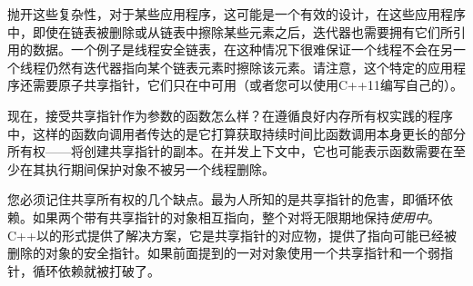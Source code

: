 抛开这些复杂性，对于某些应用程序，这可能是一个有效的设计，在这些应用程序中，即使在链表被删除或从链表中擦除某些元素之后，迭代器也需要拥有它们所引用的数据。一个例子是线程安全链表，在这种情况下很难保证一个线程不会在另一个线程仍然有迭代器指向某个链表元素时擦除该元素。请注意，这个特定的应用程序还需要原子共享指针，它们只在\cpp[20] 中可用（或者您可以使用C++11编写自己的）。

现在，接受共享指针作为参数的函数怎么样？在遵循良好内存所有权实践的程序中，这样的函数向调用者传达的是它打算获取持续时间比函数调用本身更长的部分所有权——将创建共享指针的副本。在并发上下文中，它也可能表示函数需要在至少在其执行期间保护对象不被另一个线程删除。

您必须记住共享所有权的几个缺点。最为人所知的是共享指针的危害，即循环依赖。如果两个带有共享指针的对象相互指向，整个对将无限期地保持\emph{使用中}。C++以的形式提供了解决方案，它是共享指针的对应物，提供了指向可能已经被删除的对象的安全指针。如果前面提到的一对对象使用一个共享指针和一个弱指针，循环依赖就被打破了。


